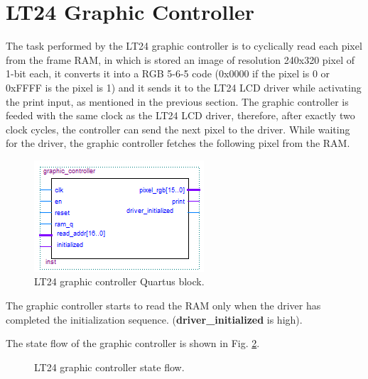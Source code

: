 \documentclass[11pt]{report}
\begin{document}
\section{LT24 Graphic Controller}\label{sec:graphic_controller}
The task performed by the LT24 graphic controller is to cyclically read each pixel from the frame RAM, in which is stored an image of resolution 240x320 pixel of 1-bit each, it converts it into a RGB 5-6-5 code (0x0000 if the pixel is 0 or 0xFFFF is the pixel is 1) and it sends it to the LT24 LCD driver while activating the print input, as mentioned in the previous section. The graphic controller is feeded with the same clock as the LT24 LCD driver, therefore, after exactly two clock cycles, the controller can send the next pixel to the driver. While waiting for the driver, the graphic controller fetches the following pixel from the RAM.

\begin{figure}[!h]
    \centering
    \includegraphics[width=0.5\linewidth]{images/graphic_interface_design/graphic_controller/graphic_controller_quartus_block.png}
    \caption{LT24 graphic controller Quartus block.}
    \label{fig:graphic_controller_quartus_block}
\end{figure}

The graphic controller starts to read the RAM only when the driver has completed the initialization sequence. (\textbf{driver\_initialized} is high).

The state flow of the graphic controller is shown in Fig. \ref{fig:graphic_controller_fsm}.

\begin{figure}[!h]
\centering
{}
\caption{LT24 graphic controller state flow.}
\label{fig:graphic_controller_fsm}
\end{figure}
\end{document}

